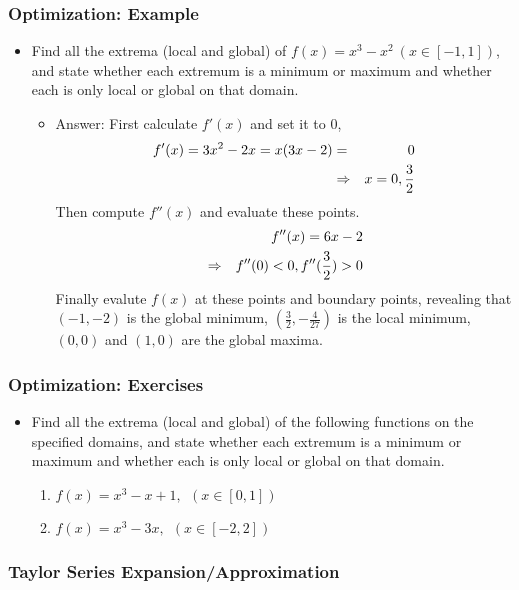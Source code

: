 \documentclass[pdflatex, 12pt]{beamer}
\begin{document}
\begin{frame}
\frametitle{Optimization: Example}
\begin{itemize}
\item Find all the extrema (local and global) of $f(x) = x^3 - x^2 \ (x \in [-1, 1])$, and state whether each extremum is a minimum or maximum and whether each is only local or global on that domain.
 \begin{itemize}
 \item Answer: First calculate $f'(x)$ and set it to 0,
  \begin{eqnarray}
  f'(x) = 3x^2 - 2x = x(3x - 2) &=& 0 \notag \\
  &\Rightarrow& x = 0, \frac{3}{2} \notag
  \end{eqnarray}
 Then compute $f''(x)$ and evaluate these points.
  \begin{eqnarray}
  && f''(x) = 6x - 2 \notag \\
  &\Rightarrow& f''(0) < 0, f''(\frac{3}{2}) > 0 \notag
  \end{eqnarray}
 Finally evalute $f(x)$ at these points and boundary points, revealing that $(-1, -2)$ is the global minimum, $(\frac{3}{2}, -\frac{4}{27})$ is the local minimum, $(0 ,0 )$ and $(1, 0)$ are the global maxima.
 \end{itemize}
\end{itemize}
\end{frame}

\begin{frame}
\frametitle{Optimization: Exercises}
\begin{itemize}
\item Find all the extrema (local and global) of the following functions on the specified domains, and state whether each extremum is a minimum or maximum and whether each is only local or global on that domain.
 \begin{enumerate}
 \item $f(x) = x^3 - x + 1, \ \ (x \in [0, 1])$
 \item $f(x) = x^3 - 3x, \ \ (x \in [-2, 2])$
 \end{enumerate}
\end{itemize}
\end{frame}

\begin{frame}
\frametitle{Taylor Series Expansion/Approximation}

\end{frame}
\end{document}
